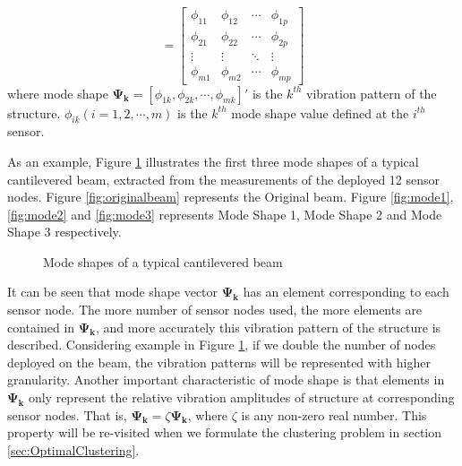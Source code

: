 \begin{equation}
[\mathbf{\Psi_1}, \mathbf{\Psi_2}, \cdots, \mathbf{\Psi_p}]=
\begin{bmatrix}
\phi_{11} & \phi_{12} & \cdots & \phi_{1p}\\
\phi_{21} & \phi_{22} & \cdots & \phi_{2p}\\
\vdots  & \vdots  & \ddots & \vdots  \\
\phi_{m1} & \phi_{m2} & \cdots & \phi_{mp}
\end{bmatrix} 
\end{equation}
where mode shape \(\mathbf{\Psi_k}=[\phi_{1k}, \phi_{2k}, \cdots, \phi_{mk}]'\) is the \(k^{th}\) vibration pattern of the structure.  \(\phi_{ik}(i=1,2,\cdots ,m)\) is the \(k^{th}\) mode shape value defined at the \(i^{th}\) sensor.

As an example, Figure \ref{fig:modes} illustrates the first three mode shapes of a typical cantilevered beam, extracted from the measurements of the deployed 12 sensor nodes. Figure \ref{fig:originalbeam} represents the Original beam. Figure \ref{fig:mode1}, \ref{fig:mode2} and \ref{fig:mode3} represents Mode Shape 1, Mode Shape 2 and Mode Shape 3 respectively.

\begin{figure}
\centering
\subfloat[]{\label{fig:originalbeam}
\figurehalfwidth{originalbeam}}
\subfloat[]{\label{fig:mode1}
\figurehalfwidth{mode1}}
\qquad
\subfloat[]{\label{fig:mode2}
\figurehalfwidth{mode2}}
\subfloat[]{\label{fig:mode3}
\figurehalfwidth{mode3}}
\caption{Mode shapes of a typical cantilevered beam}
\label{fig:modes}
\end{figure}

It can be seen that mode shape vector \(\mathbf{\Psi_k}\) has an element corresponding to each sensor node. The more number of sensor nodes used, the more elements are contained in \(\mathbf{\Psi_k}\), and more accurately this vibration pattern of the structure is described. Considering example in Figure \ref{fig:modes}, if we double the number of nodes deployed on the beam, the vibration patterns will be represented with higher granularity. Another important characteristic of mode shape is that elements in \(\mathbf{\Psi_k}\) only represent the relative vibration amplitudes of structure at corresponding sensor nodes. That is, \(\mathbf{\Psi_k}=\zeta \mathbf{\Psi_k}\), where \(\zeta\) is any non-zero real number. This property will be re-visited when we formulate the clustering problem in section \ref{sec:OptimalClustering}.